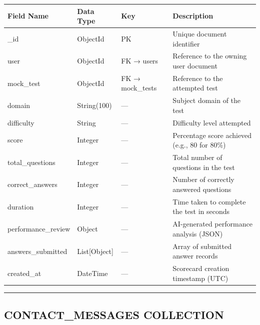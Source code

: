 \documentclass[12pt]{article}
\begin{document}
\begin{longtable}{|p{}|p{}|p{}|p{}|}
\hline
\textbf{Field Name} & \textbf{Data Type} & \textbf{Key} & \textbf{Description} \\ \hline
\endhead
\_id & ObjectId & PK & Unique document identifier \\ \hline
user & ObjectId & FK → users & Reference to the owning user document \\ \hline
mock\_test & ObjectId & FK → mock\_tests & Reference to the attempted test \\ \hline
domain & String(100) & — & Subject domain of the test \\ \hline
difficulty & String & — & Difficulty level attempted \\ \hline
score & Integer & — & Percentage score achieved (e.g., 80 for 80\%) \\ \hline
total\_questions & Integer & — & Total number of questions in the test \\ \hline
correct\_answers & Integer & — & Number of correctly answered questions \\ \hline
duration & Integer & — & Time taken to complete the test in seconds \\ \hline
performance\_review & Object & — & AI-generated performance analysis (JSON) \\ \hline
answers\_submitted & List[Object] & — & Array of submitted answer records \\ \hline
created\_at & DateTime & — & Scorecard creation timestamp (UTC) \\ \hline
\end{longtable}


\noindent\rule{\textwidth}{0.4pt}

\subsection{CONTACT\_MESSAGES COLLECTION}
\end{document}
